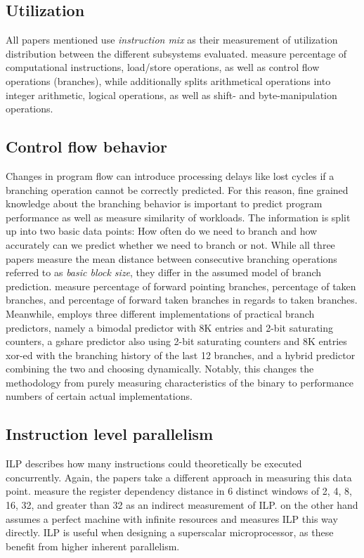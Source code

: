 \documentclass[../bachelor_paper.tex]{subfiles}
\begin{document}
\subsection{Utilization}
All papers mentioned use \emph{instruction mix} as their measurement of utilization distribution between the different subsystems evaluated. \cite{phansalkarMeasuringProgramSimilarity2005,joshiMeasuringBenchmarkSimilarity2006} measure percentage of computational instructions, load/store operations, as well as control flow operations (branches), while \cite{eeckhoutQuantifyingImpactInput} additionally splits arithmetical operations into integer arithmetic, logical operations, as well as shift- and byte-manipulation operations.

\subsection{Control flow behavior}
Changes in program flow can introduce processing delays like lost cycles if a branching operation cannot be correctly predicted. For this reason, fine grained knowledge about the branching behavior is important to predict program performance as well as measure similarity of workloads. The information is split up into two basic data points: How often do we need to branch and how accurately can we predict whether we need to branch or not. While all three papers measure the mean distance between consecutive branching operations referred to as \emph{basic block size}, they differ in the assumed model of branch prediction. \cite{phansalkarMeasuringProgramSimilarity2005,joshiMeasuringBenchmarkSimilarity2006} measure percentage of forward pointing branches, percentage of taken branches, and percentage of forward taken branches in regards to taken branches. Meanwhile, \cite{eeckhoutQuantifyingImpactInput} employs three different implementations of practical branch predictors, namely a bimodal predictor with 8K entries and 2-bit saturating counters, a gshare predictor also using 2-bit saturating counters and 8K entries xor-ed with the branching history of the last 12 branches, and a hybrid predictor combining the two and choosing dynamically. Notably, this changes the methodology from purely measuring characteristics of the binary to performance numbers of certain actual implementations.

\subsection{Instruction level parallelism}
\Acf{ILP} describes how many instructions could theoretically be executed concurrently. Again, the papers take a different approach in measuring this data point. \cite{phansalkarMeasuringProgramSimilarity2005,joshiMeasuringBenchmarkSimilarity2006} measure the register dependency distance in 6 distinct windows of 2, 4, 8, 16, 32, and greater than 32 as an indirect measurement of \ac{ILP}. \cite{eeckhoutQuantifyingImpactInput} on the other hand assumes a perfect machine with infinite resources and measures \ac{ILP} this way directly. \Ac{ILP} is useful when designing a superscalar microprocessor, as these benefit from higher inherent parallelism.
\end{document}
